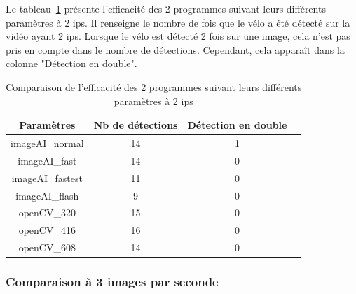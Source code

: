 Le tableau~\ref{tab_2fps} présente l'efficacité des 2 programmes suivant leurs différents paramètres à 2 ips.
Il renseigne le nombre de fois que le vélo a été détecté sur la vidéo ayant 2 ips.
Lorsque le vélo est détecté 2 fois sur une image, cela n'est pas pris en compte dans le nombre de détections.
Cependant, cela apparaît dans la colonne "Détection en double".

\begin{table}
    \begin{center}
        \begin{tabular}{|c|c|c|c|}
            \hline
            \rowcolor{tableColorDark} Paramètres & Nb de détections & Détection en double \\
            \hline

            imageAI\_normal                      & 14               & 1                   \\\hline
            imageAI\_fast                        & 14               & 0                   \\\hline
            imageAI\_fastest                     & 11               & 0                   \\\hline
            imageAI\_flash                       & 9                & 0                   \\\hline
            openCV\_320                          & 15               & 0                   \\\hline
            openCV\_416                          & 16               & 0                   \\\hline
            openCV\_608                          & 14               & 0                   \\\hline
        \end{tabular}
        \caption{Comparaison de l'efficacité des 2 programmes suivant leurs différents paramètres à 2 ips}
        \label{tab_2fps}
    \end{center}
\end{table}

\subsubsection{Comparaison à 3 images par seconde}
\label{sec:comparaisonIA:resultats:3fps}

